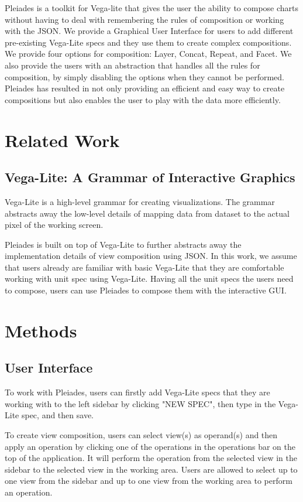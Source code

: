 \documentclass[journal]{vgtc}                %
\begin{document}
Pleiades is a toolkit for Vega-lite that gives the user the ability to compose
charts without having to deal with remembering the rules of composition or working
with the JSON. We provide a Graphical User Interface for users to add different
pre-existing Vega-Lite specs and they use them to create complex compositions.
We provide four options for composition: Layer, Concat, Repeat, and Facet. We also
provide the users with an abstraction that handles all the rules for composition,
by simply disabling the options when they cannot be performed. Pleiades has resulted
in not only providing an efficient and easy way to create compositions but also
enables the user to play with the data more efficiently.

\section{Related Work}

\subsection{Vega-Lite: A Grammar of Interactive Graphics}
Vega-Lite is a high-level grammar for creating visualizations. The grammar abstracts
away the low-level details of mapping data from dataset to the actual pixel of the
working screen.

Pleiades is built on top of Vega-Lite to further abstracts away the implementation
details of view composition using JSON. In this work, we assume that users already
are familiar with basic Vega-Lite that they are comfortable working with unit spec
using Vega-Lite. Having all the unit specs the users need to compose, users can use
Pleiades to compose them with the interactive GUI.


\section{Methods}
\subsection{User Interface}

To work with Pleiades, users can firstly add Vega-Lite specs that they are working
with to the left sidebar by clicking "NEW SPEC", then type in the Vega-Lite spec,
and then save.

To create view composition, users can select view(s) as operand(s) and then apply
an operation by clicking one of the operations in the operations bar on the top of
the application. It will perform the operation from the selected view in the sidebar
to the selected view in the working area. Users are allowed to select up to one view
from the sidebar and up to one view from the working area to perform an operation.
\end{document}
